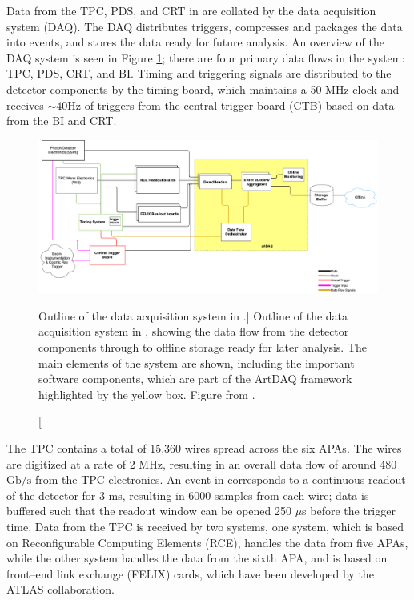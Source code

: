 Data from the TPC, PDS, and CRT in \protodune{} are collated by the data 
acquisition system (DAQ). The DAQ distributes triggers, compresses and packages 
the data into events, and stores the data ready for future analysis. 
An overview of the \protodune{} DAQ system is seen in Figure 
\ref{fig:pdsp_daq}; there are four primary data flows in the system: TPC, PDS, 
CRT, and BI. Timing and triggering signals are distributed to the detector 
components by the timing board, which maintains a 50 MHz clock and receives 
$\sim 40 \mbox{Hz}$ of triggers from the central trigger board (CTB) based on 
data from the BI and CRT\cite{Abi:2017aow}.

\begin{figure}

	\centering

	\includegraphics[width=\textwidth]{figures/pdsp_daq.pdf}

	\caption
	[Outline of the data acquisition system in \protodune{}.]
	{Outline of the data acquisition system in \protodune{}, showing the data flow
	from the detector components through to offline storage ready for later
	analysis. The main elements of the system are shown, including the important 
	software components, which are part of the ArtDAQ framework highlighted by 
	the yellow box. Figure from \cite{Abi:2017aow}.}

	\label{fig:pdsp_daq}

\end{figure}

The \protodune{} TPC contains a total of 15,360 wires spread across the six
APAs. The wires are digitized at a rate of 2 MHz, resulting in an overall data
flow of around 480 $\mbox{Gb/s}$ from the TPC electronics. An event in
\protodune{} corresponds to a continuous readout of the detector for 3 ms,
resulting in 6000 samples from each wire; data is buffered such that the readout
window can be opened 250 $\mu$s before the trigger time. Data from the TPC is
received by two systems, one system, which is based on Reconfigurable Computing Elements
(RCE)\cite{7431254}, handles the data from five APAs, while the other system
handles the data from the sixth APA, and is based on front--end link exchange 
(FELIX) cards, which have been developed by the ATLAS 
collaboration\cite{Anderson_2016}.

